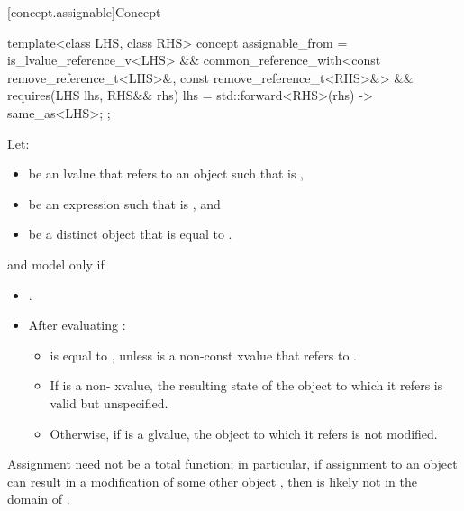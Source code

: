[concept.assignable]{Concept }

%
\begin{itemdecl}
template<class LHS, class RHS>
  concept assignable_from =
    is_lvalue_reference_v<LHS> &&
    common_reference_with<const remove_reference_t<LHS>&, const remove_reference_t<RHS>&> &&
    requires(LHS lhs, RHS&& rhs) {
      { lhs = std::forward<RHS>(rhs) } -> same_as<LHS>;
    };
\end{itemdecl}

\begin{itemdescr}
\pnum
Let:
\begin{itemize}
\item {} be an lvalue that refers to an object  such that
   is ,
\item {} be an expression such that  is
  , and
\item {} be a distinct object that is equal to .
\end{itemize}
 and  model
 only if

\begin{itemize}
\item {}.

\item After evaluating :

\begin{itemize}
\item {} is equal to , unless  is a non-const
xvalue that refers to .

\item If  is a non- xvalue, the resulting state of the
object to which it refers is valid but unspecified.

\item Otherwise, if  is a glvalue, the object to which it refers is
  not modified.
\end{itemize}
\end{itemize}

\pnum
\begin{note}
Assignment need not be a total function;
in particular, if assignment to an object  can result in a modification
of some other object , then  is likely not in the domain
of \tcode{=}.
\end{note}
\end{itemdescr}

